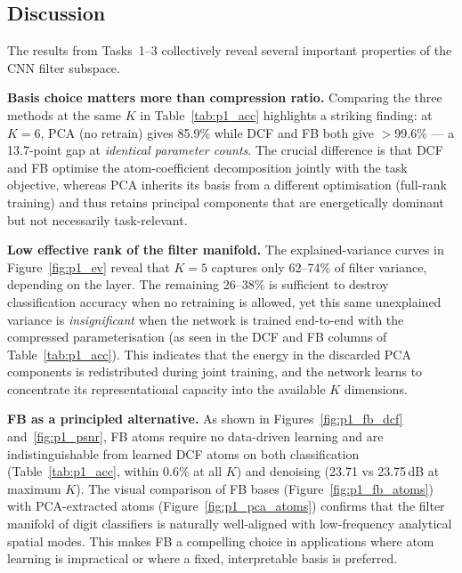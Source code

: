 \documentclass[11pt,letterpaper]{article}
\begin{document}
\subsection{Discussion}
\label{sec:p1_disc}

The results from Tasks~1--3 collectively reveal several important
properties of the CNN filter subspace.

\textbf{Basis choice matters more than compression ratio.}
Comparing the three methods at the same $K$ in Table~\ref{tab:p1_acc}
highlights a striking finding: at $K=6$, PCA (no retrain) gives 85.9\%
while DCF and FB both give $>$99.6\% --- a 13.7-point gap at
\emph{identical parameter counts}.  The crucial difference is that DCF and
FB optimise the atom-coefficient decomposition jointly with the task
objective, whereas PCA inherits its basis from a different optimisation
(full-rank training) and thus retains principal components that are
energetically dominant but not necessarily task-relevant.

\textbf{Low effective rank of the filter manifold.}
The explained-variance curves in Figure~\ref{fig:p1_ev} reveal that $K=5$
captures only 62--74\% of filter variance, depending on the layer.  The
remaining 26--38\% is sufficient to destroy classification accuracy when
no retraining is allowed, yet this same unexplained variance is
\emph{insignificant} when the network is trained end-to-end with the
compressed parameterisation (as seen in the DCF and FB columns of
Table~\ref{tab:p1_acc}).  This indicates that the energy in the discarded
PCA components is redistributed during joint training, and the network
learns to concentrate its representational capacity into the available
$K$ dimensions.

\textbf{FB as a principled alternative.}
As shown in Figures~\ref{fig:p1_fb_dcf} and~\ref{fig:p1_psnr}, FB atoms
require no data-driven learning and are indistinguishable from learned DCF
atoms on both classification (Table~\ref{tab:p1_acc}, within 0.6\% at all
$K$) and denoising (23.71 vs 23.75\,dB at maximum $K$).  The visual
comparison of FB bases (Figure~\ref{fig:p1_fb_atoms}) with PCA-extracted
atoms (Figure~\ref{fig:p1_pca_atoms}) confirms that the filter manifold
of digit classifiers is naturally well-aligned with low-frequency
analytical spatial modes.  This makes FB a compelling choice in
applications where atom learning is impractical or where a fixed,
interpretable basis is preferred.
\end{document}
